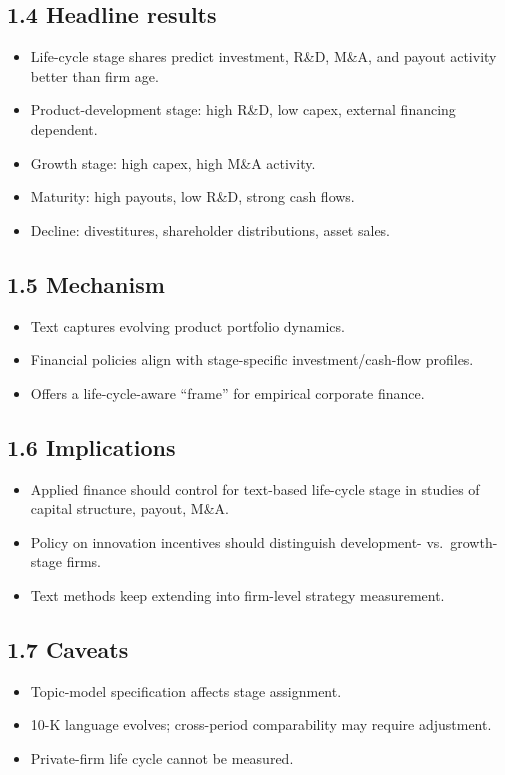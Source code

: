 \documentclass[11pt]{article}
\begin{document}
\subsection*{1.4 Headline results}
\begin{itemize}
\item Life-cycle stage shares predict investment, R\&D, M\&A, and payout activity better than firm age.
\item Product-development stage: high R\&D, low capex, external financing dependent.
\item Growth stage: high capex, high M\&A activity.
\item Maturity: high payouts, low R\&D, strong cash flows.
\item Decline: divestitures, shareholder distributions, asset sales.
\end{itemize}

\subsection*{1.5 Mechanism}
\begin{itemize}
\item Text captures evolving product portfolio dynamics.
\item Financial policies align with stage-specific investment/cash-flow profiles.
\item Offers a life-cycle-aware ``frame'' for empirical corporate finance.
\end{itemize}

\subsection*{1.6 Implications}
\begin{itemize}
\item Applied finance should control for text-based life-cycle stage in studies of capital structure, payout, M\&A.
\item Policy on innovation incentives should distinguish development- vs.\ growth-stage firms.
\item Text methods keep extending into firm-level strategy measurement.
\end{itemize}

\subsection*{1.7 Caveats}
\begin{alertbox}
\begin{itemize}
\item Topic-model specification affects stage assignment.
\item 10-K language evolves; cross-period comparability may require adjustment.
\item Private-firm life cycle cannot be measured.
\end{itemize}
\end{alertbox}
\end{document}
